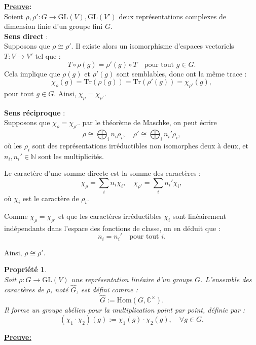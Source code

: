 \documentclass[a4paper, 14pt]{report}
\newtheorem{propriety}{Propriété}[section]
\begin{document}
\begin{onehalfspace}
{	\textbf{\underline{Preuve}:}\\
Soient \( \rho, \rho' : G \to \mathrm{GL}(V), \mathrm{GL}(V') \) deux représentations complexes de dimension finie d’un groupe fini \( G \).\\
\textbf{Sens direct} :\\
Supposons que \( \rho \cong \rho' \). Il existe alors un isomorphisme d’espaces vectoriels \( T : V \to V' \) tel que :
\[
T \circ \rho(g) = \rho'(g) \circ T \quad \text{pour tout } g \in G.
\]
Cela implique que \( \rho(g) \) et \( \rho'(g) \) sont semblables, donc ont la même trace :
\[
\chi_\rho(g) = \mathrm{Tr}(\rho(g)) = \mathrm{Tr}(\rho'(g)) = \chi_{\rho'}(g),
\]
pour tout \( g \in G \). Ainsi, \( \chi_\rho = \chi_{\rho'} \).

\vspace{1em}
\textbf{Sens réciproque} : \\
Supposons que \( \chi_\rho = \chi_{\rho'} \). par le théorème de Maschke, on peut écrire 
\[
\rho \cong \bigoplus_{i} n_i \rho_i, \quad \rho' \cong \bigoplus_{i} n_i' \rho_i,
\]
où les \( \rho_i \) sont des représentations irréductibles non isomorphes deux à deux, et \( n_i, n_i' \in \mathbb{N} \) sont les multiplicités.

Le caractère d’une somme directe est la somme des caractères :
\[
\chi_\rho = \sum_i n_i \chi_i, \quad \chi_{\rho'} = \sum_i n_i' \chi_i,
\]
où \( \chi_i \) est le caractère de \( \rho_i \).

Comme \( \chi_\rho = \chi_{\rho'} \) et que les caractères irréductibles \( \chi_i \) sont linéairement indépendants dans l’espace des fonctions de classe, on en déduit que :
\[
n_i = n_i' \quad \text{pour tout } i.
\]

Ainsi, \( \rho \cong \rho' \).




\begin{propriety} \cite{renard2009groupes} \label{proprica}\\
Soit \( \rho : G \rightarrow \mathrm{GL}(V) \) une représentation linéaire d'un groupe \(G\). L’ensemble des caractères de \( \rho \), noté \( \widehat{G} \), est défini comme :
	\[
	\widehat{G} := \mathrm{Hom}(G, \mathbb{C}^\times).
	\]
	Il forme un groupe abélien pour la multiplication point par point, définie par :
	\[
	(\chi_1 \cdot \chi_2)(g) := \chi_1(g) \cdot \chi_2(g), \quad \forall g \in G.
	\]
\end{propriety}

\textbf{\underline{Preuve:}}\\

}
\end{onehalfspace}
\end{document}

